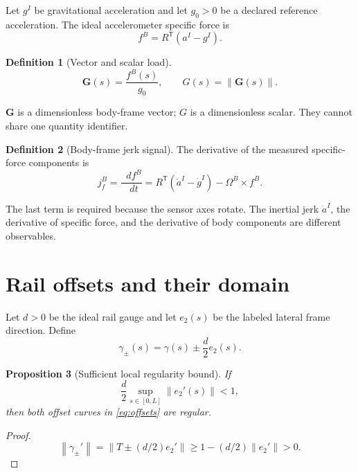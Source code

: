 \documentclass[11pt,a4paper]{article}
\theoremstyle{definition}
\newtheorem{definition}{Definition}[section]
\theoremstyle{plain}
\newtheorem{proposition}[definition]{Proposition}
\theoremstyle{remark}
\newcommand{\dd}{\mathop{}\!d}
\newcommand{\norm}[1]{\left\lVert #1\right\rVert}
\begin{document}
Let \(g^I\) be gravitational acceleration and let \(g_0>0\) be a
declared reference acceleration. The ideal accelerometer specific
force is
\begin{equation}\label{eq:specific-force}
f^B=R^{\mathsf T}(a^I-g^I).
\end{equation}

\begin{definition}[Vector and scalar load]
\begin{equation}\label{eq:load-definitions}
\bm G(s)=\frac{f^B(s)}{g_0},
\qquad
G(s)=\norm{\bm G(s)}.
\end{equation}
\end{definition}

\(\bm G\) is a dimensionless body-frame vector; \(G\) is a
dimensionless scalar. They cannot share one quantity identifier.

\begin{definition}[Body-frame jerk signal]
The derivative of the measured specific-force components is
\begin{equation}\label{eq:body-jerk}
j_f^B
=\frac{\dd f^B}{\dd t}
=R^{\mathsf T}(\dot a^I-\dot g^I)
-\Omega^B\times f^B.
\end{equation}
\end{definition}

The last term is required because the sensor axes rotate. The inertial
jerk \(\dot a^I\), the derivative of specific force, and the derivative
of body components are different observables.

\section{Rail offsets and their domain}

Let \(d>0\) be the ideal rail gauge and let \(e_2(s)\) be the labeled
lateral frame direction. Define
\begin{equation}\label{eq:offsets}
\gamma_\pm(s)=\gamma(s)\pm\frac d2e_2(s).
\end{equation}

\begin{proposition}[Sufficient local regularity bound]
If
\begin{equation}\label{eq:offset-bound}
\frac d2\sup_{s\in[0,L]}\norm{e_2'(s)}<1,
\end{equation}
then both offset curves in \cref{eq:offsets} are regular.
\end{proposition}

\begin{proof}
\[
\norm{\gamma_\pm'}
=\norm{T\pm(d/2)e_2'}
\ge1-(d/2)\norm{e_2'}>0.
\]
\end{proof}
\end{document}
